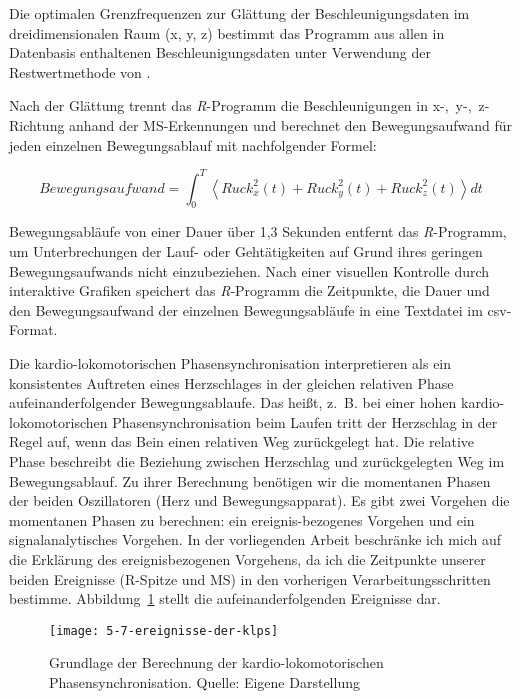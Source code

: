 Die optimalen Grenzfrequenzen zur Glättung der Beschleunigungsdaten im dreidimensionalen Raum (x, y, z) bestimmt das Programm aus allen in Datenbasis enthaltenen Beschleunigungsdaten unter Verwendung der Restwertmethode von \citet{Wells1980}.

Nach der Glättung trennt das \emph{R}-Programm die Beschleunigungen in \mbox{x-, y-, z-Richtung} anhand der \ac{MS}-Erkennungen und berechnet den Bewegungsaufwand für jeden einzelnen Bewegungsablauf mit nachfolgender Formel:

\begin{equation}
	Bewegungsaufwand = \int^T_0 \left\langle {Ruck^2_{x}(t) + Ruck^2_{y}(t) + Ruck^2_{z}(t)}\right\rangle dt
\end{equation}

Bewegungsabläufe von einer Dauer über 1,3 Sekunden entfernt das \emph{R}-Programm, um Unterbrechungen der Lauf- oder Gehtätigkeiten auf Grund ihres geringen Bewegungsaufwands nicht einzubeziehen. Nach einer visuellen Kontrolle durch interaktive Grafiken speichert das \emph{R}-Programm die Zeitpunkte, die Dauer und den Bewegungsaufwand der einzelnen Bewegungsabläufe in eine Textdatei im \acs{csv}-Format.

Die kardio-lokomotorischen Phasensynchronisation interpretieren \citet[][S.~12]{Niizeki2014} als ein konsistentes Auftreten eines Herzschlages in der gleichen relativen Phase aufeinanderfolgender Bewegungsablaufe. Das heißt, z.~B. bei einer hohen kardio-lokomotorischen Phasensynchronisation beim Laufen tritt der Herzschlag in der Regel auf, wenn das Bein einen relativen Weg zurückgelegt hat. Die relative Phase beschreibt die Beziehung zwischen Herzschlag und zurückgelegten Weg im Bewegungsablauf. Zu ihrer Berechnung benötigen wir die momentanen Phasen der beiden Oszillatoren (Herz und Bewegungsapparat). Es gibt zwei Vorgehen die momentanen Phasen zu berechnen: ein ereignis-bezogenes Vorgehen und ein signalanalytisches Vorgehen. In der vorliegenden Arbeit beschränke ich mich auf die Erklärung des ereignisbezogenen Vorgehens, da ich die Zeitpunkte unserer beiden Ereignisse (R-Spitze und \ac{MS}) in den vorherigen Verarbeitungsschritten bestimme. Abbildung~\ref{fig:5_7_ereignisse_der_klps} stellt die aufeinanderfolgenden Ereignisse dar.

\begin{figure}[t]
	\centering
		\texttt{[image: 5-7-ereignisse-der-klps]}
	\caption[Grundlage der Berechnung der kardio-lokomotorischen Phasensynchronisation]{Grundlage der Berechnung der kardio-lokomotorischen Phasensynchronisation. Quelle: Eigene Darstellung}
	\label{fig:5_7_ereignisse_der_klps}
\end{figure}

